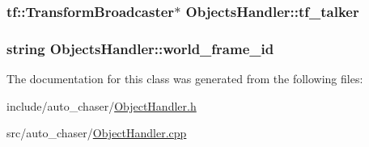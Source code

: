\subsubsection[{\texorpdfstring{tf\+\_\+talker}{tf_talker}}]{\setlength{\rightskip}{0pt plus 5cm}tf\+::\+Transform\+Broadcaster$\ast$ Objects\+Handler\+::tf\+\_\+talker\hspace{0.3cm}{\ttfamily [private]}}\hypertarget{class_objects_handler_af49de4eabb124e2ee6c9e12ebb31bca3}{}\label{class_objects_handler_af49de4eabb124e2ee6c9e12ebb31bca3}
\subsubsection[{\texorpdfstring{world\+\_\+frame\+\_\+id}{world_frame_id}}]{\setlength{\rightskip}{0pt plus 5cm}string Objects\+Handler\+::world\+\_\+frame\+\_\+id\hspace{0.3cm}{\ttfamily [private]}}\hypertarget{class_objects_handler_a1c0586ae7467bb8a3df8ad247ac7b10b}{}\label{class_objects_handler_a1c0586ae7467bb8a3df8ad247ac7b10b}


The documentation for this class was generated from the following files\+:\begin{DoxyCompactItemize}
\item 
include/auto\+\_\+chaser/\hyperlink{_object_handler_8h}{Object\+Handler.\+h}\item 
src/auto\+\_\+chaser/\hyperlink{_object_handler_8cpp}{Object\+Handler.\+cpp}\end{DoxyCompactItemize}
